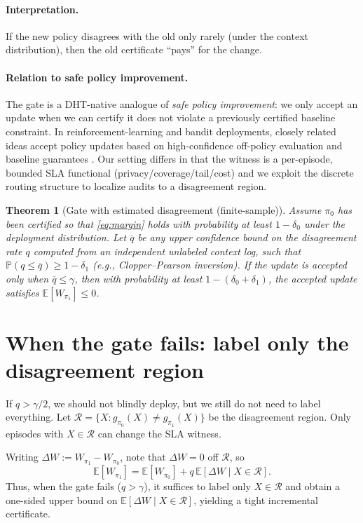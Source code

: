 \documentclass[11pt]{article}
\newtheorem{theorem}{Theorem}
\begin{document}
\paragraph{Interpretation.}
If the new policy disagrees with the old only rarely (under the context distribution), then the old certificate ``pays'' for the change.

\paragraph{Relation to safe policy improvement.}
The gate is a DHT-native analogue of \emph{safe policy improvement}: we only accept an update when we can certify it does not violate a previously certified baseline constraint.
In reinforcement-learning and bandit deployments, closely related ideas accept policy updates based on high-confidence off-policy evaluation and baseline guarantees \cite{thomas2015hcope,laroche2019spibb}.
Our setting differs in that the witness is a per-episode, bounded SLA functional (privacy/coverage/tail/cost) and we exploit the discrete routing structure to localize audits to a disagreement region.


\begin{theorem}[Gate with estimated disagreement (finite-sample)]
\label{thm:gate-est}
Assume $\pi_0$ has been certified so that \eqref{eq:margin} holds with probability at least $1-\delta_0$ under the deployment distribution.
Let $\overline q$ be any upper confidence bound on the disagreement rate $q$ computed from an \emph{independent} unlabeled context log, such that $\mathbb{P}(q\le \overline q)\ge 1-\delta_1$ (e.g., Clopper--Pearson inversion).
If the update is accepted only when $\overline q\le \gamma$, then with probability at least $1-(\delta_0+\delta_1)$, the accepted update satisfies $\mathbb{E}[W_{\pi_1}]\le 0$.
\end{theorem}

\section{When the gate fails: label only the disagreement region}
If $q>\gamma/2$, we should not blindly deploy, but we still do not need to label everything.
Let $\mathcal{R}=\{X: g_{\pi_0}(X)\neq g_{\pi_1}(X)\}$ be the disagreement region.
Only episodes with $X\in\mathcal{R}$ can change the SLA witness.

Writing $\Delta W := W_{\pi_1}-W_{\pi_0}$, note that $\Delta W=0$ off $\mathcal{R}$, so
\[
  \mathbb{E}[W_{\pi_1}] = \mathbb{E}[W_{\pi_0}] + q\,\mathbb{E}[\Delta W \mid X\in\mathcal{R}].
\]
Thus, when the gate fails ($q>\gamma$), it suffices to label only $X\in\mathcal{R}$ and obtain a one-sided upper bound on $\mathbb{E}[\Delta W \mid X\in\mathcal{R}]$, yielding a tight incremental certificate.
\end{document}
